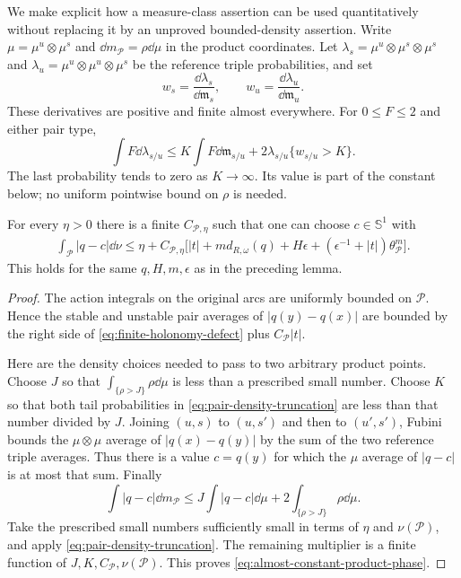 We make explicit how a measure-class assertion can be used
quantitatively without replacing it by an unproved bounded-density
assertion. Write $\mu=\mu^u\otimes\mu^s$ and
$\dd m_{\mathcal P}=\rho\dd\mu$ in the product coordinates.
Let $\lambda_s=\mu^u\otimes\mu^s\otimes\mu^s$ and
$\lambda_u=\mu^u\otimes\mu^u\otimes\mu^s$ be the reference triple
probabilities, and set
\[
 w_s=\frac{\dd\lambda_s}{\dd\mathfrak m_s},\qquad
 w_u=\frac{\dd\lambda_u}{\dd\mathfrak m_u}.
\]
These derivatives are positive and finite almost everywhere. For
$0\le F\le2$ and either pair type,
\begin{equation}\label{eq:pair-density-truncation}
 \int F\dd\lambda_{s/u}
 \le K\int F\dd\mathfrak m_{s/u}
            +2\lambda_{s/u}\{w_{s/u}>K\}.
\end{equation}
The last probability tends to zero as $K\to\infty$. Its value is part
of the constant below; no uniform pointwise bound on $\rho$ is needed.

\begin{lemma}
\label{lem:almost-constant-product-phase}
For every $\eta>0$ there is a finite $C_{\mathcal P,\eta}$ such that
one can choose $c\in\mathbb S^1$ with
\begin{align}\label{eq:almost-constant-product-phase}
 \int_{\mathcal P}|q-c|\dd\nu
 \le\eta+C_{\mathcal P,\eta}\bigl[
 |t|+m d_{R,\omega}(q)+H\epsilon
              +(\epsilon^{-1}+|t|)\theta_{\mathcal P}^m\bigr].
\end{align}
This holds for the same $q,H,m,\epsilon$ as in the preceding lemma.
\end{lemma}
\begin{proof}
The action integrals on the original arcs are uniformly bounded on
$\mathcal P$. Hence the stable and unstable pair averages of
$|q(y)-q(x)|$ are bounded by the right side of
\eqref{eq:finite-holonomy-defect} plus $C_{\mathcal P}|t|$.

Here are the density choices needed to pass to two arbitrary product
points. Choose $J$ so that
$\int_{\{\rho>J\}}\rho\dd\mu$ is less than a prescribed small number.
Choose $K$ so that both tail probabilities in
\eqref{eq:pair-density-truncation} are less than that number divided
by $J$. Joining $(u,s)$ to $(u,s')$ and then to $(u',s')$, Fubini
bounds the $\mu\otimes\mu$ average of $|q(x)-q(y)|$ by the sum of
the two reference triple averages. Thus there is a value $c=q(y)$
for which the $\mu$ average of $|q-c|$ is at most that sum. Finally
\[
 \int|q-c|\dd m_{\mathcal P}
 \le J\int|q-c|\dd\mu+2\int_{\{\rho>J\}}\rho\dd\mu.
\]
Take the prescribed small numbers sufficiently small in terms of
$\eta$ and $\nu(\mathcal P)$, and apply
\eqref{eq:pair-density-truncation}. The remaining multiplier is a
finite function of $J,K,C_{\mathcal P},\nu(\mathcal P)$.
This proves \eqref{eq:almost-constant-product-phase}.
\end{proof}


